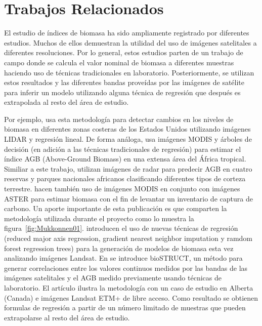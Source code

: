 \section{Trabajos Relacionados}

El estudio de índices de biomasa ha sido ampliamente registrado por diferentes 
estudios. Muchos de ellos demuestran la utilidad del uso de imágenes
satelitales a diferentes resoluciones. Por lo general, estos estudios parten de un 
trabajo de campo donde se calcula el valor nominal de biomasa a diferentes
muestras haciendo uso de técnicas tradicionales en laboratorio. Posteriormente,
se utilizan estos resultados y las diferentes bandas proveídas por las imágenes
de satélite para inferir un modelo utilizando alguna técnica de regresión que
después es extrapolada al resto del área de estudio.

Por ejemplo, \cite{klemas2013remotesensing} usa esta metodología para detectar cambios en
los niveles de biomasa en diferentes zonas costeras de los Estados Unidos utilizando
imágenes LIDAR y regresión lineal. De forma análoga, \cite{baccini2008afirst}
usa imágenes MODIS y árboles de decisión (en adición a las técnicas
tradicionales de regresión) para estimar el índice AGB (Above-Ground Biomass)
en una extensa área del África tropical. Similiar a este trabajo, \cite{mitchard2009usingsatellite}
utilizan imágenes de radar para predecir AGB en cuatro reservas y parques
nacionales africanos clasificando diferentes tipos de corteza terrestre.
\cite{muukkonen2007biomass} hacen también uso de imágenes MODIS en
conjunto con imágenes ASTER para estimar biomasa con el fin de levantar un
inventario de captura de carbono. Un aporte importante de esta publicación es
que comparten la metodología utilizada durante el proyecto como lo muestra la figura~\ref{fig:Mukkonnen01}. \cite{powell2010quantification}
introducen el uso de nuevas técnicas de regresión (reduced major axis regression,
gradient nearest neighbor imputation y ramdom forest regression trees) para la
generación de modelos de biomasa esta vez analizando imágenes Landsat.
En \cite{hall2006modeling} se introduce bioSTRUCT, un método para generar
correlaciones entre los valores continuos medidos por las bandas de las imágenes
satelitales y el AGB medido previamente usando técnicas de laboratorio. El
artículo ilustra la metodología con un caso de estudio en Alberta (Canada) e
imágenes Landsat ETM+ de libre acceso. Como resultado se obtienen formulas
de regresión a partir de un número limitado de muestras que pueden extrapolarse
al resto del área de estudio.

